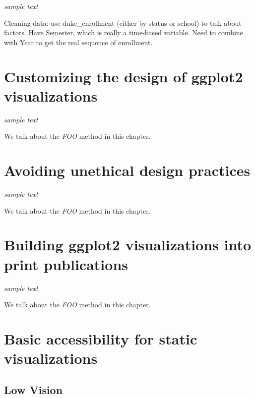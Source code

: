 \documentclass[
]{krantz}
\begin{document}
\emph{sample text}

Cleaning data: use duke\_enrollment (either by status or school) to talk about factors.
Have Semester, which is really a time-based variable. Need to combine with Year
to get the real sequence of enrollment.

\hypertarget{customizing-visualization-design}{%
\chapter{Customizing the design of ggplot2 visualizations}\label{customizing-visualization-design}}

\emph{sample text}

We talk about the \emph{FOO} method in this chapter.

\hypertarget{ethical-design-practices}{%
\chapter{Avoiding unethical design practices}\label{ethical-design-practices}}

\emph{sample text}

We talk about the \emph{FOO} method in this chapter.

\hypertarget{print-publications}{%
\chapter{Building ggplot2 visualizations into print publications}\label{print-publications}}

\emph{sample text}

We talk about the \emph{FOO} method in this chapter.

\hypertarget{accessibility-for-visualizations}{%
\chapter{Basic accessibility for static visualizations}\label{accessibility-for-visualizations}}

\hypertarget{low-vision}{%
\section{Low Vision}\label{low-vision}}
\end{document}
